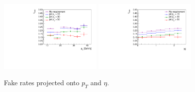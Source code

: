 \begin{figure}[!htbp]
\begin{center}
\includegraphics[width=0.45\textwidth]{figures/muon_frpt_jetscan.pdf}
\includegraphics[width=0.45\textwidth]{figures/muon_freta_jetscan.pdf}
\caption{Fake rates projected onto $p_T$ and $\eta$.}
\label{fig:mu_fr_iso05}
\end{center}
\end{figure}
